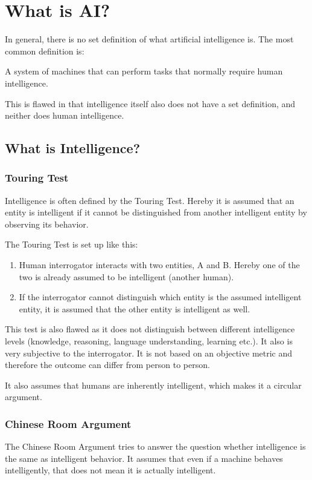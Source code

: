 \documentclass[
../../EiKI_Summary.tex,
]
{subfiles}
\begin{document}
\section{What is AI?}
In general, there is no set definition of what artificial intelligence is. 
The most common definition is:

\begin{center}
    \begin{smalldefbox*}
        A system of machines that can perform tasks that normally require human intelligence.
    \end{smalldefbox*}
\end{center}
This is flawed in that intelligence itself also does not have a set definition, and neither does human intelligence.

\subsection{What is Intelligence?}
\subsubsection{Touring Test}
Intelligence is often defined by the Touring Test.
Hereby it is assumed that an entity is intelligent if it cannot be distinguished from another intelligent entity by observing its behavior.

The Touring Test is set up like this:

\begin{enumerate}
    \item Human interrogator interacts with two entities, A and B. Hereby one of the two is already assumed to be intelligent (another human).
    \item If the interrogator cannot distinguish which entity is the assumed intelligent entity, it is assumed that the other entity is intelligent as well.
\end{enumerate}

This test is also flawed as it does not distinguish between different intelligence levels (knowledge, reasoning, language understanding, learning etc.). It also is very subjective to the interrogator. It is not based on an objective metric and therefore the outcome can differ from person to person.

It also assumes that humans are inherently intelligent, which makes it a circular argument.

\subsubsection{Chinese Room Argument}
The Chinese Room Argument tries to answer the question whether intelligence is the same as intelligent behavior. It assumes that even if a machine behaves intelligently, that does not mean it is actually intelligent.
\end{document}
